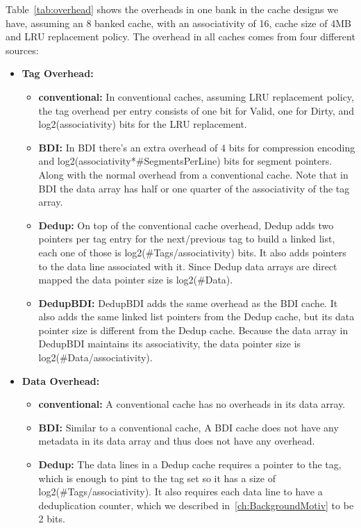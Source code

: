 Table~\ref{tab:overhead} shows the overheads in one bank in the cache designs we have, assuming an 8 banked cache, with an associativity of 16, cache size of 4MB and LRU replacement policy. The overhead in all caches comes from four different sources:
\begin{itemize}
    \item \textbf{Tag Overhead:}
    \begin{itemize}
        \item \textbf{conventional:} In conventional caches, assuming LRU replacement policy, the tag overhead per entry consists of one bit for Valid, one for Dirty, and log2(associativity) bits for the LRU replacement. 
        \item \textbf{BDI:} In BDI there's an extra overhead of 4 bits for compression encoding and log2(associativity*\#SegmentsPerLine) bits for segment pointers. Along with the normal overhead from a conventional cache. Note that in BDI the data array has half or one quarter of the associativity of the tag array.
        \item \textbf{Dedup:} On top of the conventional cache overhead, Dedup adds two pointers per tag entry for the next/previous tag to build a linked list, each one of those is log2(\#Tags/associativity) bits. It also adds pointers to the data line associated with it. Since Dedup data arrays are direct mapped the data pointer size is log2(\#Data).
        \item \textbf{DedupBDI:} DedupBDI adds the same overhead as the BDI cache. It also adds the same linked list pointers from the Dedup cache, but its data pointer size is different from the Dedup cache. Because the data array in DedupBDI maintains its associativity, the data pointer size is log2(\#Data/associativity).
    \end{itemize}
    \item \textbf{Data Overhead:}
    \begin{itemize}
        \item \textbf{conventional:} A conventional cache has no overheads in its data array.
        \item \textbf{BDI:} Similar to a conventional cache, A BDI cache does not have any metadata in its data array and thus does not have any overhead.
        \item \textbf{Dedup:} The data lines in a Dedup cache requires a pointer to the tag, which is enough to pint to the tag set so it has a size of log2(\#Tags/associativity). It also requires each data line to have a deduplication counter, which we described in~\ref{ch:BackgroundMotiv} to be 2 bits.

\end{itemize}
\end{itemize}
